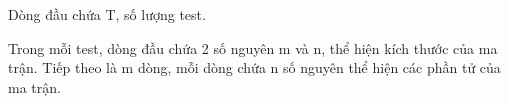 Dòng đầu chứa T, số lượng test.  

   Trong mỗi test, dòng đầu chứa 2 số nguyên m và n, thể hiện kích thước của ma trận. Tiếp theo là m dòng, mỗi dòng chứa n số nguyên thể hiện các phần tử của ma trận.